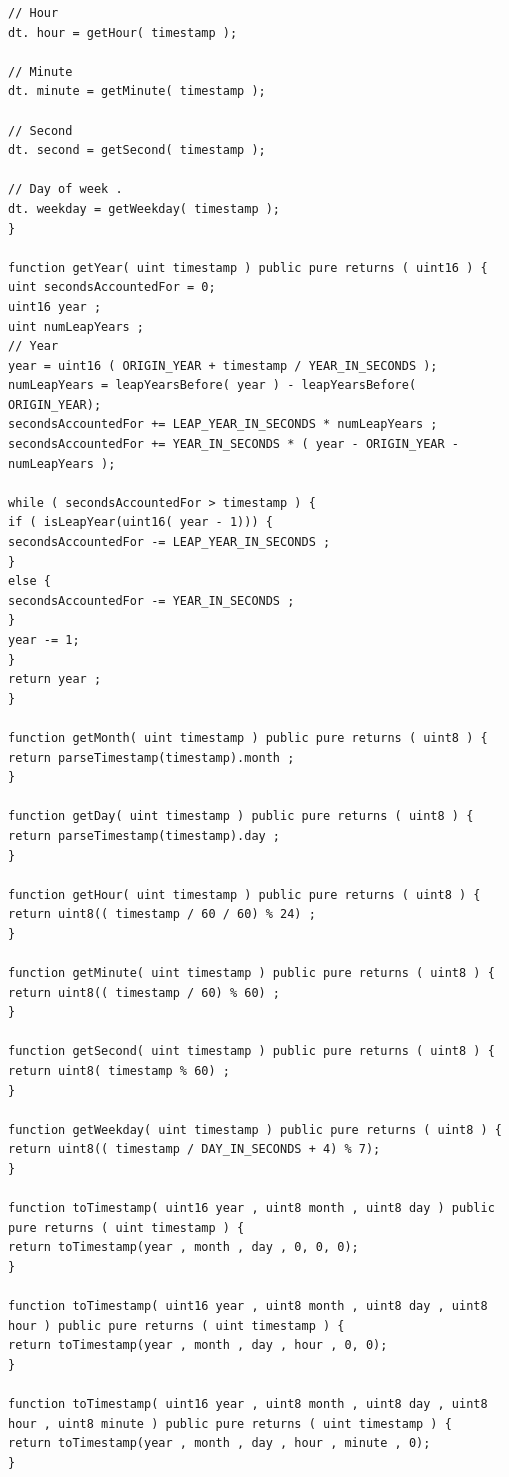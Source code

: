 \documentclass[12pt,a4paper,oneside]{article}
\begin{document}
\begin{lstlisting}
// Hour
dt. hour = getHour( timestamp );

// Minute
dt. minute = getMinute( timestamp );

// Second
dt. second = getSecond( timestamp );

// Day of week .
dt. weekday = getWeekday( timestamp );
}

function getYear( uint timestamp ) public pure returns ( uint16 ) {
uint secondsAccountedFor = 0;
uint16 year ;
uint numLeapYears ;
// Year
year = uint16 ( ORIGIN_YEAR + timestamp / YEAR_IN_SECONDS );
numLeapYears = leapYearsBefore( year ) - leapYearsBefore( ORIGIN_YEAR);
secondsAccountedFor += LEAP_YEAR_IN_SECONDS * numLeapYears ;
secondsAccountedFor += YEAR_IN_SECONDS * ( year - ORIGIN_YEAR - numLeapYears );

while ( secondsAccountedFor > timestamp ) {
if ( isLeapYear(uint16( year - 1))) {
secondsAccountedFor -= LEAP_YEAR_IN_SECONDS ;
}
else {
secondsAccountedFor -= YEAR_IN_SECONDS ;
}	
year -= 1;
}
return year ;
}

function getMonth( uint timestamp ) public pure returns ( uint8 ) {
return parseTimestamp(timestamp).month ;
}

function getDay( uint timestamp ) public pure returns ( uint8 ) {
return parseTimestamp(timestamp).day ;
}

function getHour( uint timestamp ) public pure returns ( uint8 ) {
return uint8(( timestamp / 60 / 60) % 24) ;
}

function getMinute( uint timestamp ) public pure returns ( uint8 ) {
return uint8(( timestamp / 60) % 60) ;
}

function getSecond( uint timestamp ) public pure returns ( uint8 ) {
return uint8( timestamp % 60) ;
}

function getWeekday( uint timestamp ) public pure returns ( uint8 ) {
return uint8(( timestamp / DAY_IN_SECONDS + 4) % 7);
}

function toTimestamp( uint16 year , uint8 month , uint8 day ) public pure returns ( uint timestamp ) {
return toTimestamp(year , month , day , 0, 0, 0);
}

function toTimestamp( uint16 year , uint8 month , uint8 day , uint8 hour ) public pure returns ( uint timestamp ) {
return toTimestamp(year , month , day , hour , 0, 0);
}

function toTimestamp( uint16 year , uint8 month , uint8 day , uint8 hour , uint8 minute ) public pure returns ( uint timestamp ) {
return toTimestamp(year , month , day , hour , minute , 0);
}


\end{lstlisting}
\end{document}
